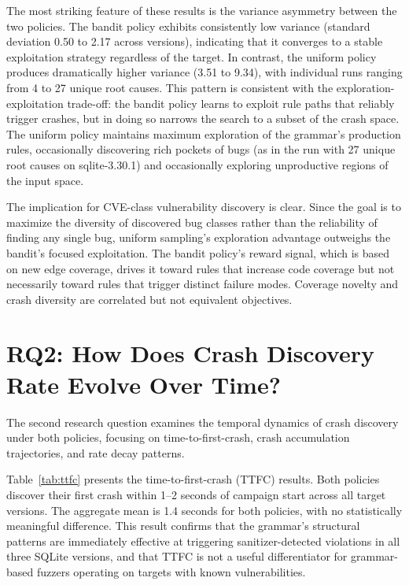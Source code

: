 The most striking feature of these results is the variance asymmetry between the two policies. The bandit policy exhibits consistently low variance (standard deviation 0.50 to 2.17 across versions), indicating that it converges to a stable exploitation strategy regardless of the target. In contrast, the uniform policy produces dramatically higher variance (3.51 to 9.34), with individual runs ranging from 4 to 27 unique root causes. This pattern is consistent with the exploration-exploitation trade-off: the bandit policy learns to exploit rule paths that reliably trigger crashes, but in doing so narrows the search to a subset of the crash space. The uniform policy maintains maximum exploration of the grammar's production rules, occasionally discovering rich pockets of bugs (as in the run with 27 unique root causes on sqlite-3.30.1) and occasionally exploring unproductive regions of the input space.

The implication for CVE-class vulnerability discovery is clear. Since the goal is to maximize the diversity of discovered bug classes rather than the reliability of finding any single bug, uniform sampling's exploration advantage outweighs the bandit's focused exploitation. The bandit policy's reward signal, which is based on new edge coverage, drives it toward rules that increase code coverage but not necessarily toward rules that trigger distinct failure modes. Coverage novelty and crash diversity are correlated but not equivalent objectives.


\section{RQ2: How Does Crash Discovery Rate Evolve Over Time?}
\label{sec:rq2}

The second research question examines the temporal dynamics of crash discovery under both policies, focusing on time-to-first-crash, crash accumulation trajectories, and rate decay patterns.

Table~\ref{tab:ttfc} presents the time-to-first-crash (TTFC) results. Both policies discover their first crash within 1--2 seconds of campaign start across all target versions. The aggregate mean is 1.4 seconds for both policies, with no statistically meaningful difference. This result confirms that the grammar's structural patterns are immediately effective at triggering sanitizer-detected violations in all three SQLite versions, and that TTFC is not a useful differentiator for grammar-based fuzzers operating on targets with known vulnerabilities.

